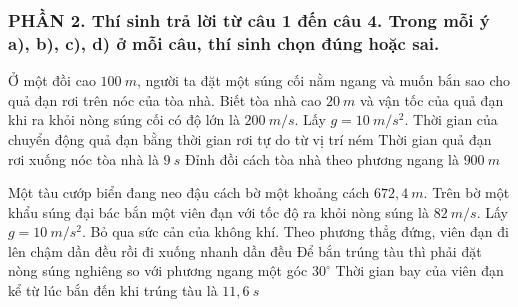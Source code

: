 \subsubsection*{PHẦN 2. Thí sinh trả lời từ câu 1 đến câu 4. Trong mỗi ý a), b), c), d) ở mỗi câu, thí sinh chọn đúng hoặc sai.}
\setcounter{ex}{0}
\begin{ex}%
Ở một đồi cao $100\ m$, người ta đặt một súng cối nằm ngang và muốn bắn sao cho quả đạn rơi trên nóc của tòa nhà. Biết tòa nhà cao $20\ m$ và vận tốc của quả đạn khi ra khỏi nòng súng cối có độ lớn là $200\ m/s$. Lấy $g=10 \ m / s^{2}$.
{\True Thời gian của chuyển động quả đạn bằng thời gian rơi tự do từ vị trí ném}
{Thời gian quả đạn rơi xuống nóc tòa nhà là $9\ s$}
{Đỉnh đồi cách tòa nhà theo phương ngang là $900\ m$}

 \end{ex}
\begin{ex}%
Một tàu cướp biển đang neo đậu cách bờ một khoảng cách $672,4 \ m$. Trên bờ một khẩu súng đại bác bắn một viên đạn với tốc độ ra khỏi nòng súng là $82 \ m / s$. Lấy $g=10 \ m / s^{2}$.
{\True Bỏ qua sức cản của không khí. Theo phương thẳg đứng, viên đạn đi lên chậm dần đều rồi đi xuống nhanh dần đều}
{Để bắn trúng tàu thì phải đặt nòng súng nghiêng so với phương ngang một góc $30^{\circ}$}
{\True Thời gian bay của viên đạn kể từ lúc bắn đến khi trúng tàu là $11,6 {\ s}$}		


 \end{ex}
